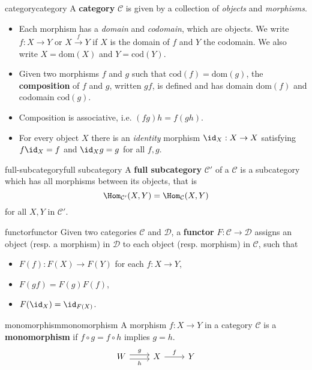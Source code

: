 \begin{topic}{category}{category}
    A \textbf{category} $\mathcal{C}$ is given by a collection of \textit{objects} and \textit{morphisms}.
    \begin{itemize}
        \item Each morphism has a \textit{domain} and \textit{codomain}, which are objects. We write $f : X \to Y$ or $X \overset{f}{\to} Y$ if $X$ is the domain of $f$ and $Y$ the codomain. We also write $X = \text{dom}(X)$ and $Y = \text{cod}(Y)$.
        
        \item Given two morphisms $f$ and $g$ such that $\text{cod}(f) = \text{dom}(g)$, the \textbf{composition} of $f$ and $g$, written $gf$, is defined and has domain $\text{dom}(f)$ and codomain $\text{cod}(g)$.
        
        \item Composition is associative, i.e. $(fg)h = f(gh)$.
        
        \item For every object $X$ there is an \textit{identity} morphism $\id_X : X \to X$ satisfying $f \id_X = f$ and $\id_X g = g$ for all $f, g$.
    \end{itemize}
\end{topic}

\begin{topic}{full-subcategory}{full subcategory}
    A \textbf{full subcategory} $\mathcal{C}'$ of a  $\mathcal{C}$ is a subcategory which has all morphisms between its objects, that is
    \[ \Hom_{\mathcal{C}'}(X, Y) = \Hom_{\mathcal{C}}(X, Y) \]
    for all $X, Y$ in $\mathcal{C}'$.
\end{topic}

\begin{topic}{functor}{functor}
    Given two categories $\mathcal{C}$ and $\mathcal{D}$, a \textbf{functor} $F : \mathcal{C} \to \mathcal{D}$ assigns an object (resp. a morphism) in $\mathcal{D}$ to each object (resp. morphism) in $\mathcal{C}$, such that
    \begin{itemize}
        \item $F(f) : F(X) \to F(Y)$ for each $f : X \to Y$,
        \item $F(gf) = F(g) F(f)$,
        \item $F(\id_X) = \id_{F(X)}$.
    \end{itemize}
\end{topic}

\begin{topic}{monomorphism}{monomorphism}
    A morphism $f : X \to Y$ in a category $\mathcal{C}$ is a \textbf{monomorphism} if $f \circ g = f \circ h$ implies $g = h$.
    \[ \begin{tikzcd} W \arrow[shift left=0.25em]{r}{g} \arrow[shift right=0.25em, swap]{r}{h} & X \arrow{r}{f} & Y \end{tikzcd} \]
\end{topic}


